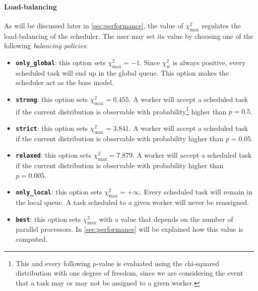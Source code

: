 \documentclass[11pt, a4paper]{article}
\begin{document}
\paragraph{Load-balancing} As will be discussed later in \autoref{sec:performance}, the value of $\chi^2_\text{max}$ regulates the load-balancing of the scheduler. The user may set its value by choosing one of the following \emph{balancing policies}:
%
\begin{itemize}
	\item {\tt\bfseries only\_global}: this option sets $\chi^2_\text{max} = -1$. Since $\chi^2_w$ is always positive, every scheduled task will end up in the global queue. This option makes the scheduler act as the base model.
	\item {\tt\bfseries strong}: this option sets $\chi^2_\text{max} = 0.455$. A worker will accept a scheduled task if the current distribution is observable with probability\footnote{This and every following $p$-value is evaluated using the chi-squared distribution with one degree of freedom, since we are considering the event that a task may or may not be assigned to a given worker.} higher than $p = 0.5$.
	\item {\tt\bfseries strict}: this option sets $\chi^2_\text{max} = 3.841$. A worker will accept a scheduled task if the current distribution is observable with probability higher than $p = 0.05$.
	\item {\tt\bfseries relaxed}: this option sets $\chi^2_\text{max} = 7.879$. A worker will accept a scheduled task if the current distribution is observable with probability higher than $p = 0.005$.
	\item {\tt\bfseries only\_local}: this option sets $\chi^2_\text{max} = +\infty$. Every scheduled task will remain in the local queue. A task scheduled to a given worker will never be reassigned.	
	\item {\tt\bfseries best}: this option sets $\chi^2_\text{max}$ with a value that depends on the number of parallel processors. In \autoref{sec:performance} will be explained how this value is computed.
\end{itemize}
\end{document}
